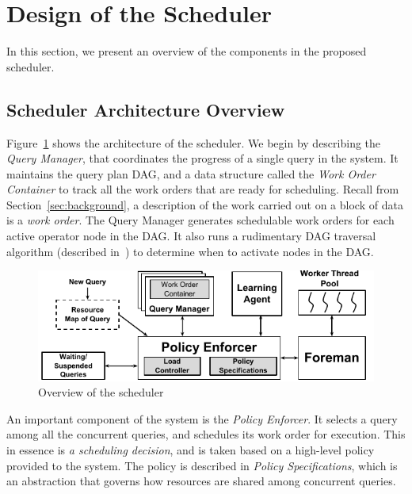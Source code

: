 \section{Design of the Scheduler}\label{sec:design}
In this section, we present an overview of the components in the proposed \sys{} scheduler.

\subsection{Scheduler Architecture Overview}\label{ssec:scheduler-arch}
Figure~\ref{fig:scheduler-architecture} shows the architecture of the \sys{} scheduler.
We begin by describing the \textit{Query Manager}, that coordinates the progress of a single query in the system.
It maintains the query plan DAG, and a data structure called
the \textit{Work Order Container} to track all the work orders that are ready for
scheduling. 
Recall from Section~\ref{sec:background}, a description of the work carried out on a block of data is a \textit{work order}. 
The Query Manager generates schedulable work orders for each active operator node in the DAG. 
It also runs a rudimentary DAG traversal algorithm (described in~\cite{supplement}) to determine when to activate nodes in the DAG. 

\begin{figure}[]
	\centering
	\includegraphics[width=\columnwidth]{policy/figures/Scheduler-Architecture.pdf}
	\vspace*{-1.5em}
	\caption{Overview of the scheduler}
	\label{fig:scheduler-architecture}
	\vspace*{-1.5em}
\end{figure}

An important component of the system is the \textit{Policy Enforcer}.
It selects a query among all the concurrent queries, and schedules its work order for execution. 
This in essence is \textit{a scheduling decision}, and is taken based on a high-level policy provided to the system.
The policy is described in \textit{Policy Specifications}, which is an
abstraction that governs how resources are shared among concurrent queries. 

